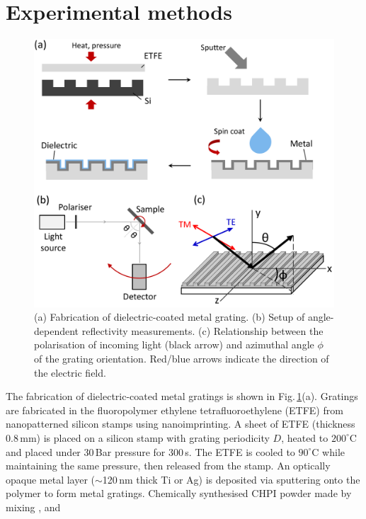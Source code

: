 \section{Experimental methods}
\begin{figure}[h!] 
\centering    
\includegraphics[width=\textwidth]{Fig1}
\caption[(a) Fabrication and (b,c) setup of optical measurements on dielectric-coated metal gratings.]{(a) Fabrication of dielectric-coated metal grating. (b) Setup of angle-dependent reflectivity measurements. (c) Relationship between the polarisation of incoming light (black arrow) and azimuthal angle $\phi$ of the grating orientation. Red/blue arrows indicate the direction of the electric field.}
\label{7Fig1}
\end{figure}
The fabrication of dielectric-coated metal gratings is shown in Fig.\,\ref{7Fig1}(a). Gratings are fabricated in the fluoropolymer ethylene tetrafluoroethylene (ETFE) from nanopatterned silicon stamps using nanoimprinting. A sheet of ETFE (thickness 0.8\,mm) is placed on a silicon stamp with grating periodicity $D$, heated to $200^{\circ}$C and placed under 30\,Bar pressure for 300\,s. The ETFE is cooled to $90^{\circ}$C while maintaining the same pressure, then released from the stamp. An optically opaque metal layer ($\sim$120\,nm thick Ti or Ag) is deposited via sputtering onto the polymer to form metal gratings. Chemically synthesised CHPI powder %
made by mixing ,  and  %
